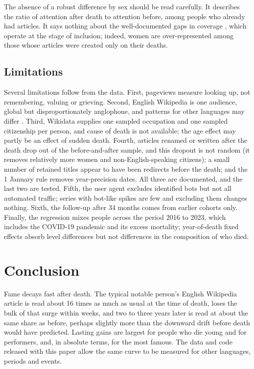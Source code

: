 \documentclass[11pt,a4paper]{article}
\begin{document}
The absence of a robust difference by sex should be read carefully. It describes the ratio of attention after death to attention before, among people who already had articles. It says nothing about the well-documented gaps in coverage \citep{wagner2015,wagner2016,konieczny2018}, which operate at the stage of inclusion; indeed, women are over-represented among those whose articles were created only on their deaths.

\subsection{Limitations}
Several limitations follow from the data. First, pageviews measure looking up, not remembering, valuing or grieving. Second, English Wikipedia is one audience, global but disproportionately anglophone, and patterns for other languages may differ \citep{lemmerich2019}. Third, Wikidata supplies one sampled occupation and one sampled citizenship per person, and cause of death is not available; the age effect may partly be an effect of sudden death. Fourth, articles renamed or written after the death drop out of the before-and-after sample, and this dropout is not random (it removes relatively more women and non-English-speaking citizens); a small number of retained titles appear to have been redirects before the death; and the 1 January rule removes year-precision dates. All three are documented, and the last two are tested. Fifth, the user agent excludes identified bots but not all automated traffic; series with bot-like spikes are few and excluding them changes nothing. Sixth, the follow-up after 34 months comes from earlier cohorts only. Finally, the regression mixes people across the period 2016 to 2023, which includes the COVID-19 pandemic and its excess mortality; year-of-death fixed effects absorb level differences but not differences in the composition of who died.

\section{Conclusion}
Fame decays fast after death. The typical notable person's English Wikipedia article is read about 16 times as much as usual at the time of death, loses the bulk of that surge within weeks, and two to three years later is read at about the same share as before, perhaps slightly more than the downward drift before death would have predicted. Lasting gains are largest for people who die young and for performers, and, in absolute terms, for the most famous. The data and code released with this paper allow the same curve to be measured for other languages, periods and events.
\end{document}
